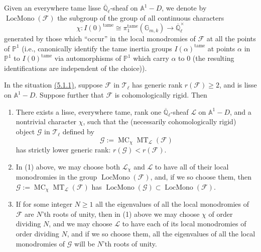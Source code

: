 Given an everywhere tame lisse \(\overline{\mathbb{Q}}_\ell\)-sheaf on
\(\mathbb{A}^1-D\), we denote by \(\operatorname{LocMono}(\mathcal{F})\) the
subgroup of the group of all continuous characters
\[
  \chi:I(0)^{\mathrm{tame}}\cong
  \pi_1^{\mathrm{tame}}(\mathbb{G}_{m,k})\to
  \overline{\mathbb{Q}}_\ell^\times
\]
generated by those which ``occur'' in the local monodromies of \(\mathcal{F}\)
at all the points of \(\mathbb{P}^1\) (i.e., canonically identify the tame
inertia groups \(I(\alpha)^{\mathrm{tame}}\) at points \(\alpha\) in
\(\mathbb{P}^1\) to \(I(0)^{\mathrm{tame}}\) via automorphisms of
\(\mathbb{P}^1\) which carry \(\alpha\) to \(0\) (the resulting identifications
are independent of the choice)).

In the situation \hyperref[par:5.1.1]{(5.1.1)}, suppose \(\mathcal{F}\) in
\(\mathcal{T}_\ell\) has generic rank \(r(\mathcal{F})\geq 2\), and is lisse
on \(\mathbb{A}^1-D\). Suppose further that \(\mathcal{F}\) is
cohomologically rigid. Then
\begin{enumerate}[label=(\arabic*)]
\item There exists a lisse, everywhere tame, rank one
\(\overline{\mathbb{Q}}_\ell\)-sheaf \(\mathcal{L}\) on \(\mathbb{A}^1-D\),
and a nontrivial character \(\chi\), such that the (necessarily
cohomologically rigid) object \(\mathcal{G}\) in \(\mathcal{T}_\ell\) defined
by
\[
  \mathcal{G}:=\operatorname{MC}_\chi\operatorname{MT}_{\mathcal{L}}(\mathcal{F})
\]
has strictly lower generic rank: \(r(\mathcal{G})<r(\mathcal{F})\).

\item In (1) above, we may choose both \(\mathcal{L}_\chi\) and
\(\mathcal{L}\) to have all of their local monodromies in the group
\(\operatorname{LocMono}(\mathcal{F})\), and, if we so choose them, then
\(\mathcal{G}:=\operatorname{MC}_\chi\operatorname{MT}_{\mathcal{L}}(\mathcal{F})\)
has \(\operatorname{LocMono}(\mathcal{G})\subset\operatorname{LocMono}(\mathcal{F})\).

\item If for some integer \(N\geq 1\) all the eigenvalues of all the local
monodromies of \(\mathcal{F}\) are \(N\)'th roots of unity, then in (1) above
we may choose \(\chi\) of order dividing \(N\), and we may choose
\(\mathcal{L}\) to have each of its local monodromies of order dividing \(N\),
and if we so choose them,
all the eigenvalues of all the local monodromies of \(\mathcal{G}\) will be
\(N\)'th roots of unity.
\end{enumerate}

